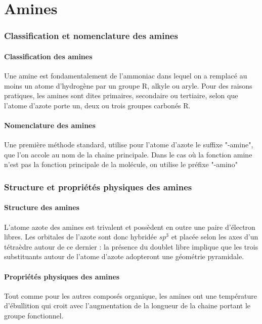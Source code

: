 \part{Amines}

\section{Classification et nomenclature des amines}

\subsection{Classification des amines}

Une amine est fondamentalement de l'ammoniac dans lequel on a remplacé au moins un atome d'hydrogène par un groupe R, alkyle ou aryle.
Pour des raisons pratiques, les amines sont dites primaires, secondaire ou tertiaire, selon que l'atome d'azote porte un, deux ou trois groupes carbonés R.

\subsection{Nomenclature des amines}
Une première méthode standard, utilise pour l'atome d'azote le suffixe "-amine", que l'on accole au nom de la chaine principale.
Dans le cas où la fonction amine n'est pas la fonction principale de la molécule, on utilise le préfixe "-amino"

\section{Structure et propriétés physiques des amines}
\subsection{Structure des amines}
L'atome azote des amines est trivalent et possèdent en outre une paire d'électron libres.
Les orbitales de l'azote sont donc hybridée $sp^3$ et placée selon les axes d'un tétraèdre autour de ce dernier : la présence du doublet libre implique que les trois substituants autour de l'atome d'azote adopteront une géométrie pyramidale.


\subsection{Propriétés physiques des amines}
Tout comme pour les autres composés organique, les amines ont une température d'ébullition qui croit avec l'augmentation de la longueur de la chaine portant le groupe fonctionnel.

